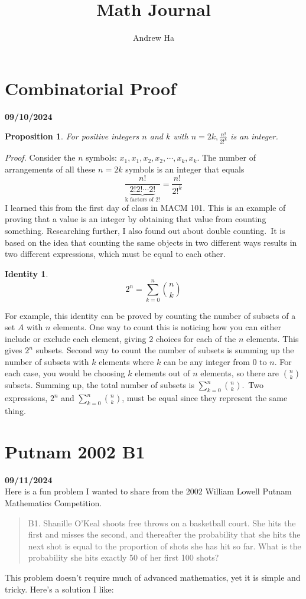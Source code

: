 \documentclass[12pt, oneside]{article}
\title{Math Journal}
\author{Andrew Ha}
\date{}								%
\newtheorem{proposition}{Proposition}
\newtheorem{identity}{Identity}
\begin{document}
\maketitle
\section*{Combinatorial Proof}
\textbf{09/10/2024}
\begin{proposition} For positive integers $n$ and $k$ with $n=2k, \frac{n!}{2!^k}$ is an integer. \end{proposition}
\emph{Proof.}  Consider the $n$ symbols: $x_1, x_1, x_2, x_2, \cdots, x_k, x_k$.
The number of arrangements of all these $n = 2k$ symbols is an integer that equals
\[
\frac{n!}{\underbrace{2! 2! \cdots 2!}_{\text{k factors of 2!}}} = \frac{n!}{2!^k}
\]
I learned this from the first day of class in MACM 101. This is an example of proving that a value is an integer by obtaining that value from counting something. Researching further, I also found out about double counting.\ It is based on the idea that counting the same objects in two different ways results in two different expressions, which must be equal to each other. 
\begin{identity} 
\[
2^n = \sum_{k=0}^{n}  \binom{n}{k}
\]
\end{identity}
For example, this identity can be proved by counting the number of subsets of a set $A$ with $n$ elements. One way to count this is noticing how you can either include or exclude each element, giving 2 choices for each of the $n$ elements. This gives $2^n$ subsets. Second way to count the number of subsets is summing up the number of subsets with $k$ elements where $k$ can be any integer from 0 to $n$. For each case, you would be choosing $k$ elements out of $n$ elements, so there are $\binom{n}{k}$ subsets.
Summing up, the total number of subsets is $\sum_{k=0}^{n}  \binom{n}{k}$.\ Two expressions, $2^n$ and $\sum_{k=0}^{n}  \binom{n}{k}$, must be equal since they represent the same thing.
\section*{Putnam 2002 B1}
\textbf{09/11/2024}
\\
\noindent Here is a fun problem I wanted to share from the 2002 William Lowell Putnam Mathematics Competition.
\begin{quote}
B1. Shanille O'Keal shoots free throws on a basketball court. She hits
the first and misses the second, and thereafter the probability that
she hits the next shot is equal to the proportion of shots she
has hit so far. What is the probability she hits exactly 50 of
her first 100 shots?
\end{quote}
This problem doesn't require much of advanced mathematics, yet it is simple and tricky. Here's a solution I like:\\
\end{document}
